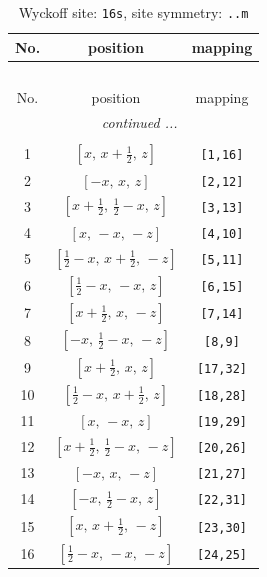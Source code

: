 \documentclass[fleqn,8pt]{jsarticle}
\begin{document}
\renewcommand{\arraystretch}{1.2}
\begin{longtable}{ccc}
\caption{Wyckoff site: {\tt 16s}, site symmetry: {\tt ..m}}
 \\
 \hline \hline
No. & position & mapping \\ \hline \endfirsthead

\multicolumn{2}{l}{\tablename\ \thetable{}} \\
 \hline \hline
No. & position & mapping \\ \hline \endhead

 \hline \hline
\multicolumn{2}{r}{\footnotesize\it continued ...} \\ \endfoot

 \hline \hline
\multicolumn{2}{r}{} \\ \endlastfoot

1 & $\left[ x,\, x + \frac{1}{2},\, z \right]$ & {\tt [1,16]} \\ \hline
2 & $\left[ - x,\, x,\, z \right]$ & {\tt [2,12]} \\ \hline
3 & $\left[ x + \frac{1}{2},\, \frac{1}{2} - x,\, z \right]$ & {\tt [3,13]} \\ \hline
4 & $\left[ x,\, - x,\, - z \right]$ & {\tt [4,10]} \\ \hline
5 & $\left[ \frac{1}{2} - x,\, x + \frac{1}{2},\, - z \right]$ & {\tt [5,11]} \\ \hline
6 & $\left[ \frac{1}{2} - x,\, - x,\, z \right]$ & {\tt [6,15]} \\ \hline
7 & $\left[ x + \frac{1}{2},\, x,\, - z \right]$ & {\tt [7,14]} \\ \hline
8 & $\left[ - x,\, \frac{1}{2} - x,\, - z \right]$ & {\tt [8,9]} \\ \hline
9 & $\left[ x + \frac{1}{2},\, x,\, z \right]$ & {\tt [17,32]} \\ \hline
10 & $\left[ \frac{1}{2} - x,\, x + \frac{1}{2},\, z \right]$ & {\tt [18,28]} \\ \hline
11 & $\left[ x,\, - x,\, z \right]$ & {\tt [19,29]} \\ \hline
12 & $\left[ x + \frac{1}{2},\, \frac{1}{2} - x,\, - z \right]$ & {\tt [20,26]} \\ \hline
13 & $\left[ - x,\, x,\, - z \right]$ & {\tt [21,27]} \\ \hline
14 & $\left[ - x,\, \frac{1}{2} - x,\, z \right]$ & {\tt [22,31]} \\ \hline
15 & $\left[ x,\, x + \frac{1}{2},\, - z \right]$ & {\tt [23,30]} \\ \hline
16 & $\left[ \frac{1}{2} - x,\, - x,\, - z \right]$ & {\tt [24,25]} \\
\end{longtable}
\end{document}
